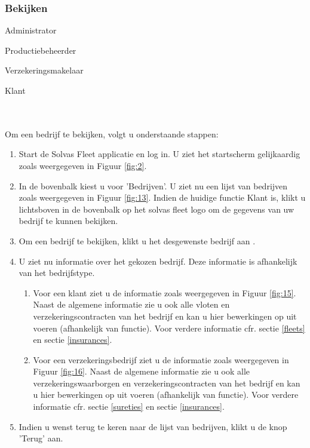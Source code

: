 \documentclass[11pt,openany]{article}
\newcommand{\cmark}{\ding{51}}%
\newcommand{\done}{\rlap{$\square$}{\raisebox{2pt}{\large\hspace{1pt}\cmark}}%
	\hspace{-2.5pt}}
\begin{document}
\subsubsection{Bekijken}
\label{company_show}
\begin{todolist}
	\item[\done] Administrator
	\item[\done] Productiebeheerder
	\item[\done] Verzekeringsmakelaar
	\item[\done] Klant 
\end{todolist}
\\
\\
Om een bedrijf te bekijken, volgt u onderstaande stappen:
\begin{enumerate}
	\item Start de Solvas Fleet applicatie en log in. U ziet het startscherm gelijkaardig zoals weergegeven in Figuur \ref{fig:2}.
	\item In de bovenbalk kiest u voor 'Bedrijven'. U ziet nu een lijst van bedrijven zoals weergegeven in Figuur \ref{fig:13}. Indien de huidige functie Klant is, klikt u lichtsboven in de bovenbalk op het solvas fleet logo om de gegevens van uw bedrijf te kunnen bekijken.
	\item Om een bedrijf te bekijken, klikt u het desgewenste bedrijf aan	. 
	\item U ziet nu informatie over het gekozen bedrijf. Deze informatie is afhankelijk van het bedrijfstype.
	\begin{enumerate}
		\item Voor een klant ziet u de informatie zoals weergegeven in Figuur \ref{fig:15}.
		Naast de algemene informatie zie u ook alle vloten en verzekeringscontracten van het bedrijf en kan u hier bewerkingen op uit voeren (afhankelijk van functie). Voor verdere informatie cfr. sectie \ref{fleets} en sectie \ref{insurances}.
		\item Voor een verzekeringsbedrijf ziet u de informatie zoals weergegeven in Figuur \ref{fig:16}.
		Naast de algemene informatie zie u ook alle verzekeringswaarborgen en verzekeringscontracten van het bedrijf en kan u hier bewerkingen op uit voeren (afhankelijk van functie). Voor verdere informatie cfr. sectie \ref{sureties} en sectie \ref{insurances}.
	\end{enumerate} 
	\item Indien u wenst terug te keren naar de lijst van bedrijven, klikt u de knop 'Terug' aan.
\end{enumerate}
\end{document}
